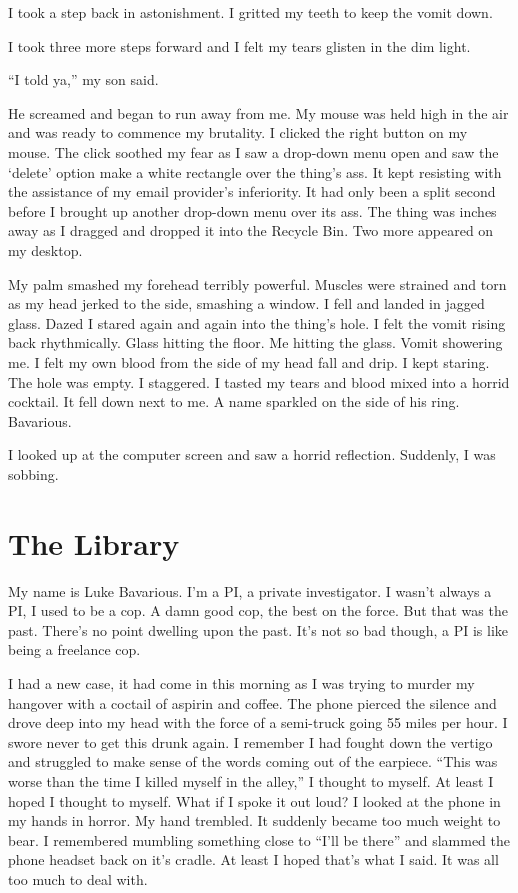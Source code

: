 I took a step back in astonishment. I gritted my teeth to keep the
vomit down.

I took three more steps forward and I felt my tears glisten in the
dim light.

``I told ya,'' my son said.

He screamed and began to run away from me. My mouse was held high
in the air and was ready to commence my brutality. I clicked the
right button on my mouse. The click soothed my fear as I saw a
drop-down menu open and saw the `delete' option make a
white rectangle over the thing's ass. It kept resisting with the
assistance of my email provider's inferiority. It had only
been a split second before I brought up another drop-down menu over
its ass. The thing was inches away as I dragged and dropped it into
the Recycle Bin. Two more appeared on my desktop.

My palm smashed my forehead terribly powerful. Muscles were
strained and torn as my head jerked to the side, smashing a window.
I fell and landed in jagged glass. Dazed I stared again and again
into the thing's hole. I felt the vomit rising back rhythmically.
Glass hitting the floor. Me hitting the glass. Vomit showering me.
I felt my own blood from the side of my head fall and drip. I kept
staring. The hole was empty. I staggered. I tasted my tears and
blood mixed into a horrid cocktail. It fell down next to me. A name
sparkled on the side of his ring. Bavarious.

I looked up at the computer screen and saw a horrid reflection.
Suddenly, I was sobbing. 
 



\chapter{The Library}





My name is Luke Bavarious. I'm a PI, a private investigator. I
wasn't always a PI, I used to be a cop. A damn good cop, the best
on the force. But that was the past. There's no point dwelling upon
the past. It's not so bad though, a PI is like being a freelance
cop.



I had a new case, it had come in this morning as I was trying to
murder my hangover with a coctail of aspirin and coffee. The phone
pierced the silence and drove deep into my head with the force of a
semi-truck going 55 miles per hour. I swore never to get this drunk
again. I remember I had fought down the vertigo and struggled to
make sense of the words coming out of the earpiece. ``This was worse
than the time I killed myself in the alley,'' I thought to myself.
At least I hoped I thought to myself. What if I spoke it out loud?
I looked at the phone in my hands in horror. My hand trembled. It
suddenly became too much weight to bear. I remembered mumbling
something close to ``I'll be there'' and slammed the phone headset
back on it's cradle. At least I hoped that's what I said. It was
all too much to deal with.



